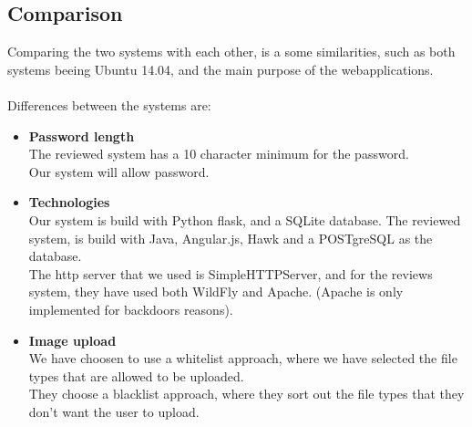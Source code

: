 \subsection{Comparison}

Comparing the two systems with each other, is a some similarities, such as both systems beeing Ubuntu 14.04, and the main purpose of the webapplications. \\ \\
Differences between the systems are: \\

\begin{itemize} 
\item \textbf{Password length} \\
The reviewed system has a 10 character minimum for the password.\\
Our system will allow password.\\

\item \textbf{Technologies} \\
Our system is build with Python flask, and a SQLite database. The reviewed system, is build with Java, Angular.js, Hawk and a POSTgreSQL as the database.\\
The http server that we used is SimpleHTTPServer, and for the reviews system, they have used both WildFly and Apache. (Apache is only implemented for backdoors reasons).\\

\item \textbf{Image upload} \\
We have choosen to use a whitelist approach, where we have selected the file types that are allowed to be uploaded. \\
They choose a blacklist approach, where they sort out the file types that they don't want the user to upload.\\ 

\end{itemize}